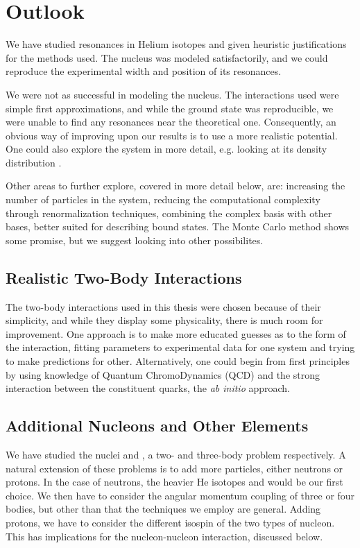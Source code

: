 \documentclass[../main/report.tex]{subfiles}
\begin{document}
\chapter{Outlook}
\label{cha:outlook}


We have studied resonances in Helium isotopes and given heuristic justifications for the methods used. The  nucleus was modeled satisfactorily, and we could reproduce the experimental width and position of its resonances. 

We were not as successful in modeling the  nucleus. The interactions used were simple first approximations, and while the ground state was reproducible, we were unable to find any resonances near the theoretical one. Consequently, an obvious way of improving upon our results is to use a more realistic potential. One could also explore the  system in more detail, e.g. looking at its density distribution \cite{radii}.

Other areas to further explore, covered in more detail below, are: increasing the number of particles in the system, reducing the computational complexity through renormalization techniques, combining the complex basis with other bases, better suited for describing bound states.
The Monte Carlo method shows some promise, but we suggest looking into other possibilites.

\section{Realistic Two-Body Interactions}
The two-body interactions used in this thesis were chosen because of their simplicity, and while they display some physicality, there is much room for improvement. 
One approach is to make more educated guesses as to the form of the interaction, fitting parameters to experimental data for one system and trying to make predictions for other.
Alternatively, one could begin from first principles by using knowledge of Quantum ChromoDynamics (QCD) and the strong interaction between the constituent quarks, the \emph{ab initio} approach.

\section{Additional Nucleons and Other Elements}

We have studied the nuclei  and , a two- and three-body problem respectively. 
A natural extension of these problems is to add more particles, either neutrons or protons.
In the case of neutrons, the heavier He isotopes  and  would be our first choice.
We then have to consider the angular momentum coupling of three or four bodies, but other than that the techniques we employ are general.
Adding protons, we have to consider the different isospin of the two types of nucleon.
This has implications for the nucleon-nucleon interaction, discussed below.
\end{document}
